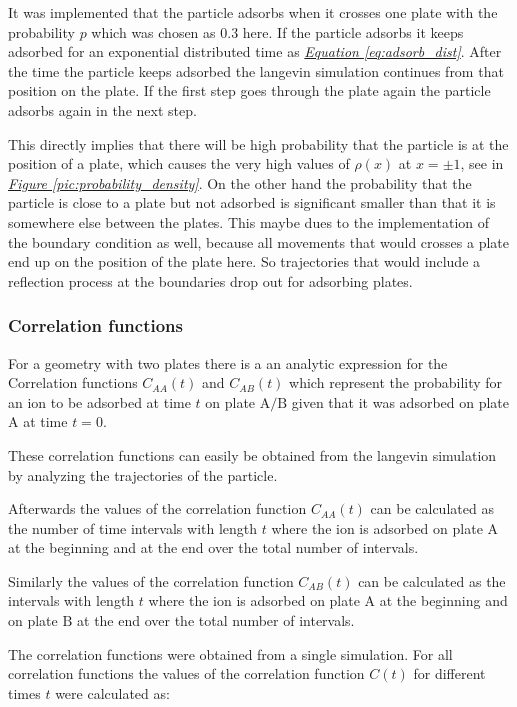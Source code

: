 \documentclass[a4paper, parskip=half]{scrartcl}
\newcommand{\myFigRef}[1]{\textit{\hyperref[#1]{Figure \ref*{#1}}}}
\newcommand{\myEqRef}[1]{\textit{\hyperref[eq:#1]{Equation \ref*{eq:#1}}}}
\begin{document}
It was implemented that the particle adsorbs when it crosses one plate with the probability $p$ which was chosen as $0.3$ here. 
If the particle adsorbs it keeps adsorbed for an exponential distributed time as \myEqRef{adsorb_dist}. After the time the particle keeps adsorbed the langevin simulation continues from that position on the plate. If the first step goes through the plate again the particle adsorbs again in the next step.

This directly implies that there will be high probability that the particle is at the position of a plate, which causes the very high values of $\rho(x)$ at $x = \pm 1$, see in \myFigRef{pic:probability_density}. On the other hand the probability that the particle is close to a plate but not adsorbed is significant smaller than that it is somewhere else between the plates. This maybe dues to the implementation of the boundary condition as well, because all movements that would crosses a plate end up on the position of the plate here. So trajectories that would include a reflection process at the boundaries drop out for adsorbing plates. 


\subsubsection{Correlation functions}\label{correlation_functions}
For a geometry with two plates there is a an analytic expression for the Correlation functions $C_{AA}(t)$ and $C_{AB}(t)$ which represent the probability for an ion to be adsorbed at time $t$ on plate $\mathrm{A}/\mathrm{B}$ given that it was adsorbed on plate $\mathrm{A}$ at time $t=0$.

These correlation functions can easily be obtained from the langevin simulation by analyzing the trajectories of the particle. 

Afterwards the values of the correlation function $C_{AA}(t)$ can be calculated as the number of time intervals with length $t$ where the ion is adsorbed on plate $\mathrm{A}$ at the beginning and at the end over the total number of intervals.

Similarly the values of the correlation function $C_{AB}(t)$ can be calculated as the intervals with length $t$ where the ion is adsorbed on plate $\mathrm{A}$ at the beginning and on plate $\mathrm{B}$ at the end over the total number of intervals.

The correlation functions were obtained from a single simulation. For all correlation functions the values of the correlation function $C(t)$ for different times $t$ were calculated as:
\end{document}
